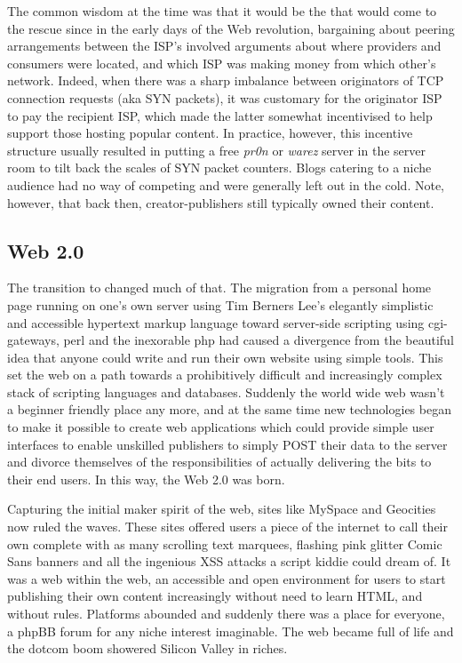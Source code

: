 The common wisdom at the time was that it would be the  that would come to the rescue since in the early days of the Web revolution, bargaining about peering arrangements between the ISP's involved arguments about where providers and consumers were located, and which ISP was making money from which other's network. Indeed, when there was a sharp imbalance between originators of TCP connection requests (aka SYN packets), it was customary for the originator ISP to pay the recipient ISP, which made the latter somewhat incentivised to help support those hosting popular content. In practice, however, this incentive structure usually resulted in putting a free \emph{pr0n} or \emph{warez} server in the server room to tilt back the scales of SYN packet counters. Blogs catering to a niche audience had no way of competing and were generally left out in the cold. Note, however, that back then, creator-publishers still typically owned their content.

\subsection{Web 2.0 \statusgreen}\label{sec:web_2}

The transition to  changed much of that. The migration from a personal home page running on one's own server using Tim Berners Lee's elegantly simplistic and accessible hypertext markup language toward server-side scripting using cgi-gateways, perl and the inexorable php had caused a divergence from the beautiful idea that anyone could write and run their own website using simple tools. This set the web on a path towards a prohibitively difficult and increasingly complex stack of scripting languages and databases. Suddenly the world wide web wasn't a beginner friendly place any more, and at the same time new technologies began to make it possible to create web applications which could provide simple user interfaces to enable unskilled publishers to simply POST their data to the server and divorce themselves of the responsibilities of actually delivering the bits to their end users. In this way, the Web 2.0 was born.

Capturing the initial maker spirit of the web, sites like MySpace and Geocities now ruled the waves. These sites offered users a piece of the internet to call their own complete with as many scrolling text marquees, flashing pink glitter Comic Sans banners and all the ingenious XSS attacks a script kiddie could dream of. It was a web within the web, an accessible and open environment for users to start publishing their own content increasingly without need to learn HTML, and without rules. Platforms abounded and suddenly there was a place for everyone, a phpBB forum for any niche interest imaginable. The web became full of life and the dotcom boom showered Silicon Valley in riches.

